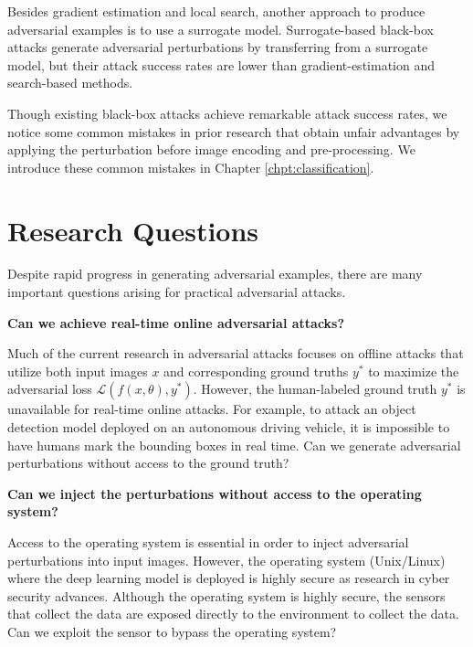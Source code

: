 Besides gradient estimation and local search, another approach to produce adversarial examples is to use a surrogate model. Surrogate-based black-box attacks generate adversarial perturbations by transferring from a surrogate model, but their attack success rates are lower than gradient-estimation and search-based methods.

Though existing black-box attacks achieve remarkable attack success rates, we notice some common mistakes in prior research that obtain unfair advantages by applying the perturbation before image encoding and pre-processing. We introduce these common mistakes in Chapter \ref{chpt:classification}.

\section{Research Questions}
\label{sec:research_question}

Despite rapid progress in generating adversarial examples, there are many important questions arising for practical adversarial attacks.

\vspace{0.5cm}

\textbf{Can we achieve real-time online adversarial attacks?}

Much of the current research in adversarial attacks focuses on offline attacks that utilize both input images $x$ and corresponding ground truths $y^*$ to maximize the adversarial loss $\mathcal{L}(f(x, \theta), y^*)$. However, the human-labeled ground truth $y^*$ is unavailable for real-time online attacks. For example, to attack an object detection model deployed on an autonomous driving vehicle, it is impossible to have humans mark the bounding boxes in real time. Can we generate adversarial perturbations without access to the ground truth?

\vspace{0.5cm}

\textbf{Can we inject the perturbations without access to the operating system?}

Access to the operating system is essential in order to inject adversarial perturbations into input images. However, the operating system (Unix/Linux) where the deep learning model is deployed is highly secure as research in cyber security advances. Although the operating system is highly secure, the sensors that collect the data are exposed directly to the environment to collect the data. Can we exploit the sensor to bypass the operating system?

